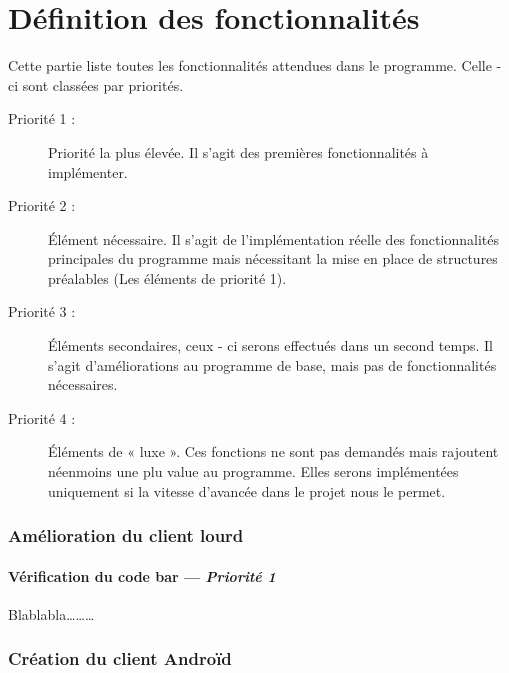 \part{Définition des fonctionnalités}
Cette partie liste toutes les fonctionnalités attendues dans le programme. Celle - ci sont classées par priorités.

\begin{description}
\item [Priorité 1 :]
	Priorité la plus élevée. Il s'agit des premières fonctionnalités à implémenter.

\item [Priorité 2 :]
	Élément nécessaire. Il s'agit de l'implémentation réelle des fonctionnalités principales du programme mais nécessitant la mise en place de structures préalables (Les éléments de priorité 1). 

\item [Priorité 3 :]
	Éléments secondaires, ceux - ci serons effectués dans un second temps. Il s'agit d'améliorations au programme de base, mais pas de fonctionnalités nécessaires.  

\item [Priorité 4 :]
	Éléments de « luxe ». Ces fonctions ne sont pas demandés mais rajoutent néenmoins une plu value au programme. Elles serons implémentées uniquement si la vitesse d'avancée dans le projet nous le permet.
\end{description}


\section{Amélioration du client lourd}

\subsection[Vérification du code bar]{Vérification du code bar — \emph{Priorité 1}}
Blablabla………




\section{Création du client Androïd}





